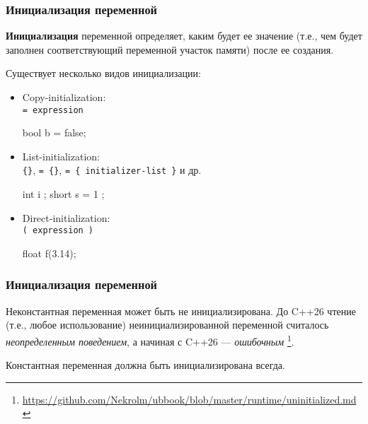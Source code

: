 \documentclass[compress, 8pt]{beamer}
\begin{document}
\begin{frame}[fragile]

    \frametitle{Инициализация переменной}

    \textbf{Инициализация} переменной определяет, каким будет ее значение
    (т.е., чем будет заполнен соответствующий переменной участок памяти)
    после ее создания.

    Существует несколько видов инициализации:

    \begin{itemize}

        \item Copy-initialization: \\ \verb|= expression|
            \begin{myinplacelisting}[minted language=cpp]
bool b = false;
            \end{myinplacelisting}

        \item List-initialization: \\
            \verb|{}|, \verb|= {}|, \verb|= { initializer-list }| и др.
            \begin{myinplacelisting}[minted language=cpp]
int i {};
short s = { 1 };
            \end{myinplacelisting}

        \item Direct-initialization: \\ \verb|( expression )|
            \begin{myinplacelisting}[minted language=cpp]
float f(3.14);
            \end{myinplacelisting}

    \end{itemize}

\end{frame}

\begin{frame}[fragile]

    \frametitle{Инициализация переменной}

    Неконстантная переменная может быть не инициализирована.
    До C++26 чтение (т.е., любое использование) неинициализированной переменной
    считалось \textit{неопределенным поведением}, а начиная с C++26 ---
    \textit{ошибочным}
    \footnote{\url{https://github.com/Nekrolm/ubbook/blob/master/runtime/uninitialized.md}}.

    \hfill \break
    Константная переменная должна быть инициализирована всегда.

\end{frame}
\end{document}
